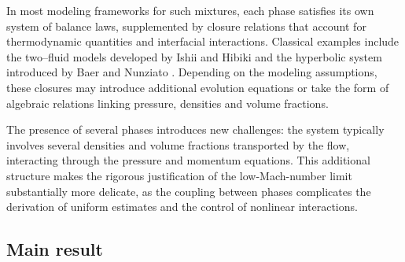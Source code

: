 \documentclass[11pt, twoside, a4paper]{article}
\theoremstyle{plain}
\theoremstyle{remark}
\numberwithin{equation}{section}
\begin{document}
In most modeling frameworks for such mixtures, each phase satisfies its own system of balance laws, supplemented by closure relations that account for thermodynamic quantities and interfacial interactions. Classical examples include the two–fluid models developed by Ishii and Hibiki \cite{ishii2010thermo} and the hyperbolic system introduced by Baer and Nunziato \cite{baer1986two}. Depending on the modeling assumptions, these closures may introduce additional evolution equations or take the form of algebraic relations linking pressure, densities and volume fractions.

The presence of several phases introduces new challenges: the system typically involves several densities and volume fractions transported by the flow, interacting through the pressure and momentum equations. This additional structure makes the rigorous justification of the low-Mach-number limit substantially more delicate, as the coupling between phases complicates the derivation of uniform estimates and the control of nonlinear interactions.




\subsection{Main result}
\end{document}
